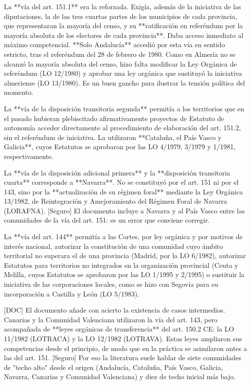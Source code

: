 \documentclass[10pt,a4paper]{article}
\begin{document}
La **vía del art. 151.1** era la reforzada. Exigía, además de la iniciativa de las diputaciones, la de las tres cuartas partes de los municipios de cada provincia, que representaran la mayoría del censo, y su **ratificación en referéndum por la mayoría absoluta de los electores de cada provincia**. Daba acceso inmediato al máximo competencial. **Solo Andalucía** accedió por esta vía en sentido estricto, tras el referéndum del 28 de febrero de 1980. Como en Almería no se alcanzó la mayoría absoluta del censo, hizo falta modificar la Ley Orgánica de referéndum (LO 12/1980) y aprobar una ley orgánica que sustituyó la iniciativa almeriense (LO 13/1980). Es un buen gancho para ilustrar la tensión política del momento.

La **vía de la disposición transitoria segunda** permitía a los territorios que en el pasado hubieran plebiscitado afirmativamente proyectos de Estatuto de autonomía acceder directamente al procedimiento de elaboración del art. 151.2, sin el referéndum de iniciativa. La utilizaron **Cataluña, el País Vasco y Galicia**, cuyos Estatutos se aprobaron por las LO 4/1979, 3/1979 y 1/1981, respectivamente.

La **vía de la disposición adicional primera** y la **disposición transitoria cuarta** corresponde a **Navarra**. No se constituyó por el art. 151 ni por el 143, sino por la **actualización de su régimen foral** mediante la Ley Orgánica 13/1982, de Reintegración y Amejoramiento del Régimen Foral de Navarra (LORAFNA). [Seguro] El documento incluye a Navarra y al País Vasco entre las comunidades de la vía del art. 151: es un error que conviene corregir.

La **vía del art. 144** permitía a las Cortes, por ley orgánica y por motivos de interés nacional, autorizar la constitución de una comunidad cuyo ámbito territorial no superara el de una provincia (Madrid, por la LO 6/1982), autorizar Estatutos para territorios no integrados en la organización provincial (Ceuta y Melilla, cuyos Estatutos se aprobaron por las LO 1/1995 y 2/1995) o sustituir la iniciativa de las corporaciones locales, como se hizo con Segovia para su incorporación a Castilla y León (LO 5/1983).

[DOC] El documento añade con acierto la existencia de casos intermedios. Canarias y la Comunidad Valenciana utilizaron la vía del art. 143, pero acompañada de **leyes orgánicas de transferencia** del art. 150.2 CE: la LO 11/1982 (LOTRACA) y la LO 12/1982 (LOTRAVA). Estas leyes ampliaron sus competencias desde el principio, de modo que en la práctica se asimilaron antes a las del art. 151. [Seguro] Por eso la literatura suele hablar de siete comunidades de "techo alto" desde el origen (Andalucía, Cataluña, País Vasco, Galicia, Navarra, Canarias y Comunidad Valenciana) y diez de techo inicial más bajo.
\end{document}

